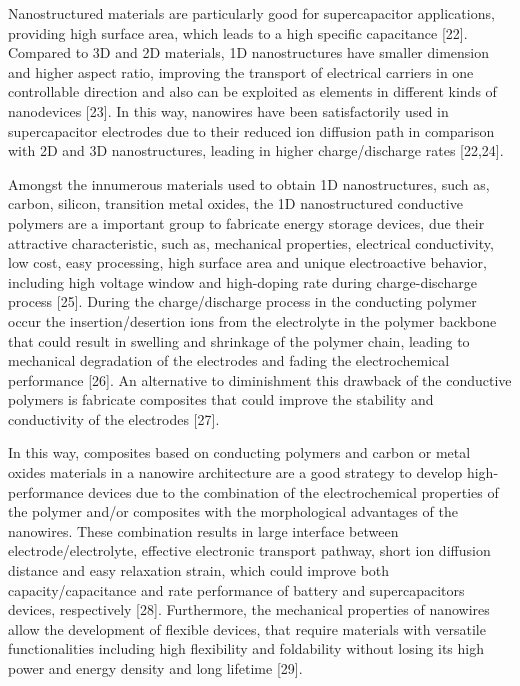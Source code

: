 Nanostructured materials are particularly good for supercapacitor applications, providing high surface area, which leads to a high specific capacitance [22]. Compared to 3D and 2D materials, 1D nanostructures have smaller dimension and higher aspect ratio, improving the transport of electrical carriers in one controllable direction and also can be exploited as elements in different kinds of nanodevices [23]. In this way, nanowires have been satisfactorily used in supercapacitor electrodes due to their reduced ion diffusion path in comparison with 2D and 3D nanostructures, leading in higher charge/discharge rates [22,24].

Amongst the innumerous materials used to obtain 1D nanostructures, such as, carbon, silicon, transition metal oxides, the 1D nanostructured conductive polymers are a important group to fabricate energy storage devices, due their attractive characteristic, such as, mechanical properties, electrical conductivity, low cost, easy processing, high surface area and unique electroactive behavior, including high voltage window and high-doping rate during charge-discharge process [25]. During the charge/discharge process in the conducting polymer occur the insertion/desertion ions from the electrolyte in the polymer backbone that could result in swelling and shrinkage of the polymer chain, leading to mechanical degradation of the electrodes and fading the electrochemical performance [26]. An alternative to diminishment this drawback of the conductive polymers is fabricate composites that could improve the stability and conductivity of the electrodes [27].

In this way, composites based on conducting polymers and carbon or metal oxides materials in a nanowire architecture are a good strategy to develop high-performance devices due to the combination of the electrochemical properties of the polymer and/or composites with the morphological advantages of the nanowires. These combination results in large interface between electrode/electrolyte, effective electronic transport pathway, short ion diffusion distance and easy relaxation strain, which could improve both capacity/capacitance and rate performance of battery and supercapacitors devices, respectively [28]. Furthermore, the mechanical properties of nanowires allow the development of flexible devices, that require materials with versatile functionalities including high flexibility and foldability without losing its high power and energy density and long lifetime [29].

